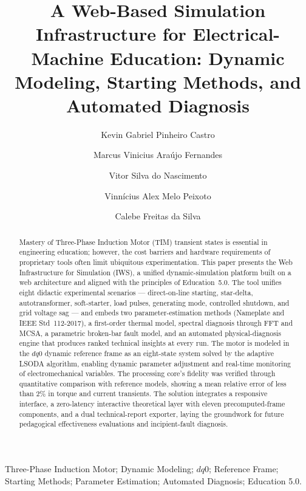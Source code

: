 \documentclass[a4paper]{ifacconf}
\begin{document}
\begin{frontmatter}
\vspace*{-2cm}
\title{A Web-Based Simulation Infrastructure for Electrical-Machine Education: Dynamic Modeling, Starting Methods, and Automated Diagnosis}

\author[First]{Kevin Gabriel Pinheiro Castro}
\author[First]{Marcus Vinicius Araújo Fernandes}
\author[First]{Vitor Silva do Nascimento}
\author[First]{Vinnícius Alex Melo Peixoto}
\author[First]{Calebe Freitas da Silva}

\address[First]{Industry Directorate, Natal-Central Campus, Federal Institute of Education, Science and Technology of Rio Grande do Norte (IFRN), RN, Brazil. (e-mail: k.g.pinheiro.castro@gmail.com; marcus.fernandes@ifrn.edu.br; vitrsn@gmail.com; vinicius.alex.melo@hotmail.com; calebe8839@gmail.com)}
\vskip 1mm

\renewcommand{\abstractname}{{\bf Abstract:~}}
\begin{abstract}
Mastery of Three-Phase Induction Motor (TIM) transient states is essential in engineering education; however, the cost barriers and hardware requirements of proprietary tools often limit ubiquitous experimentation. This paper presents the Web Infrastructure for Simulation (IWS), a unified dynamic-simulation platform built on a web architecture and aligned with the principles of Education~5.0. The tool unifies eight didactic experimental scenarios — direct-on-line starting, star-delta, autotransformer, soft-starter, load pulses, generating mode, controlled shutdown, and grid voltage sag — and embeds two parameter-estimation methods (Nameplate and IEEE Std~112-2017), a first-order thermal model, spectral diagnosis through FFT and MCSA, a parametric broken-bar fault model, and an automated physical-diagnosis engine that produces ranked technical insights at every run. The motor is modeled in the $dq0$ dynamic reference frame as an eight-state system solved by the adaptive LSODA algorithm, enabling dynamic parameter adjustment and real-time monitoring of electromechanical variables. The processing core's fidelity was verified through quantitative comparison with reference models, showing a mean relative error of less than 2\% in torque and current transients. The solution integrates a responsive interface, a zero-latency interactive theoretical layer with eleven precomputed-frame components, and a dual technical-report exporter, laying the groundwork for future pedagogical effectiveness evaluations and incipient-fault diagnosis.
\end{abstract}

\begin{keyword}
Three-Phase Induction Motor; Dynamic Modeling; $dq0$; Reference Frame; Starting Methods; Parameter Estimation; Automated Diagnosis; Education 5.0.
\end{keyword}

\end{frontmatter}
\end{document}
